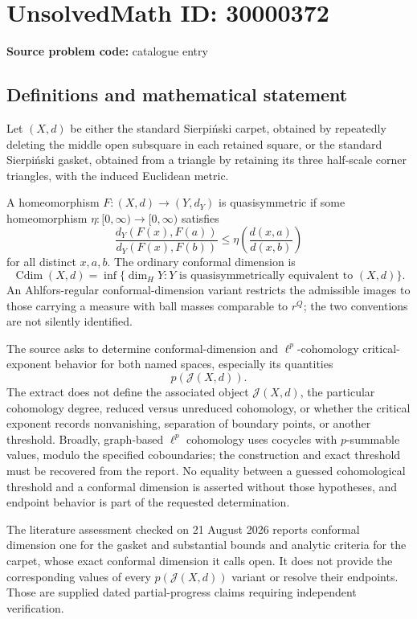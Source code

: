 \documentclass[11pt]{article}
\begin{document}
\section*{UnsolvedMath ID: 30000372}
\textbf{Source problem code:} catalogue entry
\subsection{Definitions and mathematical statement}
Let $(X,d)$ be either the standard Sierpi\'nski carpet, obtained by repeatedly deleting the middle open subsquare in each retained square, or the standard Sierpi\'nski gasket, obtained from a triangle by retaining its three half-scale corner triangles, with the induced Euclidean metric.

A homeomorphism $F:(X,d)\to(Y,d_Y)$ is quasisymmetric if some homeomorphism $\eta:[0,\infty)\to[0,\infty)$ satisfies
\[
 \frac{d_Y(F(x),F(a))}{d_Y(F(x),F(b))}
 \le\eta\!\left(\frac{d(x,a)}{d(x,b)}\right)
\]
for all distinct $x,a,b$. The ordinary conformal dimension is
\[
 \operatorname{Cdim}(X,d)=\inf\{\dim_HY:Y\text{ is quasisymmetrically equivalent to }(X,d)\}.
\]
An Ahlfors-regular conformal-dimension variant restricts the admissible images to those carrying a measure with ball masses comparable to $r^Q$; the two conventions are not silently identified.

The source asks to determine conformal-dimension and $\ell^p$-cohomology critical-exponent behavior for both named spaces, especially its quantities
\[
 p(\mathcal J(X,d)).
\]
The extract does not define the associated object $\mathcal J(X,d)$, the particular cohomology degree, reduced versus unreduced cohomology, or whether the critical exponent records nonvanishing, separation of boundary points, or another threshold. Broadly, graph-based $\ell^p$ cohomology uses cocycles with $p$-summable values, modulo the specified coboundaries; the construction and exact threshold must be recovered from the report. No equality between a guessed cohomological threshold and a conformal dimension is asserted without those hypotheses, and endpoint behavior is part of the requested determination.

The literature assessment checked on 21 August 2026 reports conformal dimension one for the gasket and substantial bounds and analytic criteria for the carpet, whose exact conformal dimension it calls open. It does not provide the corresponding values of every $p(\mathcal J(X,d))$ variant or resolve their endpoints. Those are supplied dated partial-progress claims requiring independent verification.
\end{document}
